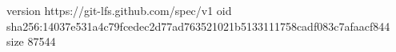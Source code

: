 version https://git-lfs.github.com/spec/v1
oid sha256:14037e531a4c79fcedec2d77ad763521021b5133111758cadf083c7afaacf844
size 87544

